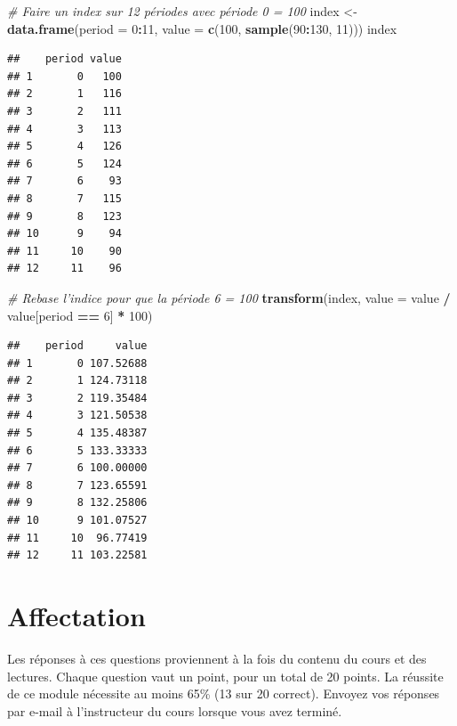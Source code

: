\documentclass[]{article}
\newenvironment{Shaded}{\begin{snugshade}}{\end{snugshade}}
\newcommand{\CommentTok}[1]{\textcolor[rgb]{0.56,0.35,0.01}{\textit{#1}}}
\newcommand{\DataTypeTok}[1]{\textcolor[rgb]{0.13,0.29,0.53}{#1}}
\newcommand{\DecValTok}[1]{\textcolor[rgb]{0.00,0.00,0.81}{#1}}
\newcommand{\KeywordTok}[1]{\textcolor[rgb]{0.13,0.29,0.53}{\textbf{#1}}}
\newcommand{\NormalTok}[1]{#1}
\newcommand{\OperatorTok}[1]{\textcolor[rgb]{0.81,0.36,0.00}{\textbf{#1}}}
\newcommand{\StringTok}[1]{\textcolor[rgb]{0.31,0.60,0.02}{#1}}
\begin{document}
\begin{Shaded}
\begin{Highlighting}[]
\CommentTok{# Faire un index sur 12 périodes avec période 0 = 100}
\NormalTok{index <-}\StringTok{ }\KeywordTok{data.frame}\NormalTok{(}\DataTypeTok{period =} \DecValTok{0}\OperatorTok{:}\DecValTok{11}\NormalTok{, }\DataTypeTok{value =} \KeywordTok{c}\NormalTok{(}\DecValTok{100}\NormalTok{, }\KeywordTok{sample}\NormalTok{(}\DecValTok{90}\OperatorTok{:}\DecValTok{130}\NormalTok{, }\DecValTok{11}\NormalTok{)))}
\NormalTok{index}
\end{Highlighting}
\end{Shaded}

\begin{verbatim}
##    period value
## 1       0   100
## 2       1   116
## 3       2   111
## 4       3   113
## 5       4   126
## 6       5   124
## 7       6    93
## 8       7   115
## 9       8   123
## 10      9    94
## 11     10    90
## 12     11    96
\end{verbatim}

\begin{Shaded}
\begin{Highlighting}[]
\CommentTok{# Rebase l'indice pour que la période 6 = 100}
\KeywordTok{transform}\NormalTok{(index, }\DataTypeTok{value =}\NormalTok{ value }\OperatorTok{/}\StringTok{ }\NormalTok{value[period }\OperatorTok{==}\StringTok{ }\DecValTok{6}\NormalTok{] }\OperatorTok{*}\StringTok{ }\DecValTok{100}\NormalTok{)}
\end{Highlighting}
\end{Shaded}

\begin{verbatim}
##    period     value
## 1       0 107.52688
## 2       1 124.73118
## 3       2 119.35484
## 4       3 121.50538
## 5       4 135.48387
## 6       5 133.33333
## 7       6 100.00000
## 8       7 123.65591
## 9       8 132.25806
## 10      9 101.07527
## 11     10  96.77419
## 12     11 103.22581
\end{verbatim}

\hypertarget{affectation}{%
\section{Affectation}\label{affectation}}

Les réponses à ces questions proviennent à la fois du contenu du cours et des lectures. Chaque question vaut un point, pour un total de 20 points. La réussite de ce module nécessite au moins 65\% (13 sur 20 correct). Envoyez vos réponses par e-mail à l'instructeur du cours lorsque vous avez terminé.
\end{document}
